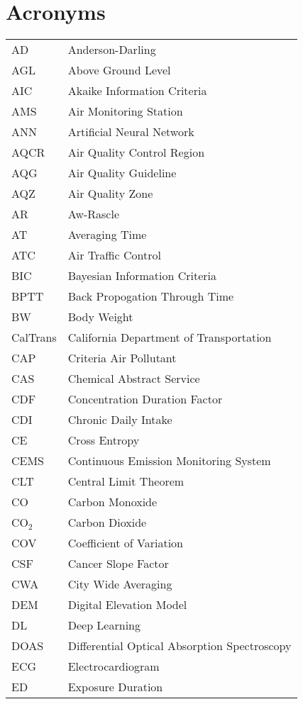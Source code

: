 \chapter*{Acronyms}

\ssp
\small

\begin{longtable}{ll}
AD & Anderson-Darling \\
AGL & Above Ground Level \\
AIC & Akaike Information Criteria \\
AMS & Air Monitoring Station \\
ANN & Artificial Neural Network \\
AQCR & Air Quality Control Region \\
AQG & Air Quality Guideline \\
AQZ & Air Quality Zone \\
AR & Aw-Rascle \\
AT & Averaging Time \\
ATC & Air Traffic Control \\
BIC & Bayesian Information Criteria \\
BPTT & Back Propogation Through Time \\
BW & Body Weight \\
CalTrans & California Department of Transportation \\
CAP & Criteria Air Pollutant \\
CAS & Chemical Abstract Service \\
CDF & Concentration Duration Factor \\
CDI & Chronic Daily Intake \\
CE & Cross Entropy \\
CEMS & Continuous Emission Monitoring System \\
CLT & Central Limit Theorem \\
CO & Carbon Monoxide \\
CO$_{2}$ & Carbon Dioxide \\
COV & Coefficient of Variation \\
CSF & Cancer Slope Factor \\
CWA & City Wide Averaging \\
DEM & Digital Elevation Model \\
DL & Deep Learning \\
DOAS & Differential Optical Absorption Spectroscopy \\
ECG & Electrocardiogram \\
ED & Exposure Duration \\

\end{longtable}
